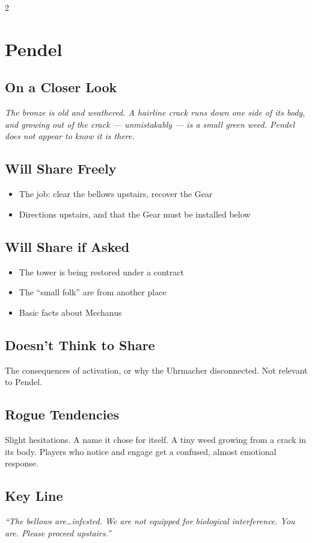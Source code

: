 \documentclass[10pt,letterpaper]{article}
\begin{document}
\begin{multicols}{2}
\section*{Pendel}
\subsection*{On a Closer Look}
\begin{readaloud}
\itshape
The bronze is old and weathered. A hairline crack runs down one side of its body, and growing out of the crack --- unmistakably --- is a small green weed. Pendel does not appear to know it is there.
\end{readaloud}
\subsection*{Will Share Freely}
\begin{itemize}
\item The job: clear the bellows upstairs, recover the Gear
\item Directions upstairs, and that the Gear must be installed below
\end{itemize}
\subsection*{Will Share if Asked}
\begin{itemize}
\item The tower is being restored under a contract
\item The ``small folk'' are from another place
\item Basic facts about Mechanus
\end{itemize}
\subsection*{Doesn't Think to Share}
The consequences of activation, or why the Uhrmacher disconnected. Not relevant to Pendel.
\subsection*{Rogue Tendencies}
Slight hesitations. A name it chose for itself. A tiny weed growing from a crack in its body. Players who notice and engage get a confused, almost emotional response.
\subsection*{Key Line}
\textit{``The bellows are\ldots infested. We are not equipped for biological interference. You are. Please proceed upstairs.''}


\end{multicols}
\end{document}
